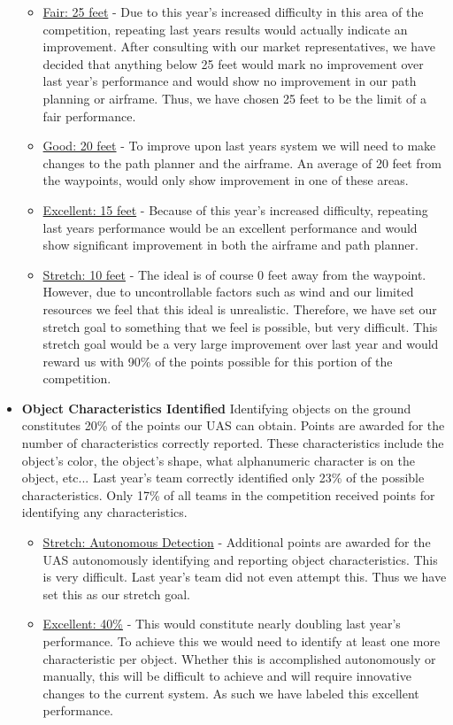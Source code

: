 \documentclass[]{auvsi_doc}
\begin{document}
\begin{itemize}
	\begin{itemize}
	\item  \underline{Fair: 25 feet} -  Due to this year's increased difficulty in this area of the competition, repeating last years results would actually indicate an improvement. After consulting with our market representatives, we have decided that anything below 25 feet would mark no improvement over last year's performance and would show no improvement in our path planning or airframe. Thus, we have chosen 25 feet to be the limit of a fair performance. 
	\item \underline{Good: 20 feet} -  To improve upon last years system we will need to make changes to the path planner and the airframe. An average of 20 feet from the waypoints, would only show improvement in one of these areas. 
	\item \underline{Excellent: 15 feet} -  Because of this year's increased difficulty, repeating last years performance would be an excellent performance and would show significant improvement in both the airframe and path planner.
	\item \underline{Stretch: 10 feet} -  The ideal is of course 0 feet away from the waypoint. However, due to uncontrollable factors such as wind and our limited resources we feel that this ideal is unrealistic. Therefore, we have set our stretch goal to something that we feel is possible, but very difficult. This stretch goal would be a very large improvement over last year and would reward us with 90\% of the points possible for this portion of the competition. 
	\end{itemize}
\item \textbf{Object Characteristics Identified} Identifying objects on the ground constitutes 20\% of the points our UAS can obtain. Points are awarded for the number of characteristics correctly reported. These characteristics include the object's color, the object's shape, what alphanumeric character is on the object, etc... Last year's team correctly identified only 23\% of the possible characteristics. Only 17\% of all teams in the competition received points for identifying any characteristics.
	\begin{itemize}
	\item \underline{Stretch: Autonomous Detection} - Additional points are awarded for the UAS autonomously identifying and reporting object characteristics. This is very difficult. Last year's team did not even attempt this. Thus we have set this as our stretch goal.
	\item \underline{Excellent: 40\%} - This would constitute nearly doubling last year's performance. To achieve this we would need to identify at least one more characteristic per object. Whether this is accomplished autonomously or manually, this will be difficult to achieve and will require innovative changes to the current system. As such we have labeled this excellent performance.

\end{itemize}
\end{itemize}
\end{document}
